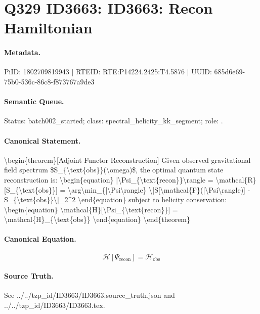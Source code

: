 \section*{Q329 ID3663: ID3663: Recon Hamiltonian}
\paragraph{Metadata.}
PiID: 1802709819943 | RTEID: RTE:P14224.2425:T4.5876 | UUID: 685d6e69-75b0-536c-86c8-f873767a9de3

\paragraph{Semantic Queue.}
Status: batch002\_started; class: spectral\_helicity\_kk\_segment; role: .

\paragraph{Canonical Statement.}
\textbackslash{}begin\{theorem\}[Adjoint Functor Reconstruction] Given observed gravitational field spectrum \$S\_\{\textbackslash{}text\{obs\}\}(\textbackslash{}omega)\$, the optimal quantum state reconstruction is: \textbackslash{}begin\{equation\} |\textbackslash{}Psi\_\{\textbackslash{}text\{recon\}\}\textbackslash{}rangle = \textbackslash{}mathcal\{R\}[S\_\{\textbackslash{}text\{obs\}\}] = \textbackslash{}arg\textbackslash{}min\_\{|\textbackslash{}Psi\textbackslash{}rangle\} \textbackslash{}|S[\textbackslash{}mathcal\{F\}(|\textbackslash{}Psi\textbackslash{}rangle)] - S\_\{\textbackslash{}text\{obs\}\}\textbackslash{}|\_2\textasciicircum{}2 \textbackslash{}end\{equation\} subject to helicity conservation: \textbackslash{}begin\{equation\} \textbackslash{}mathcal\{H\}[\textbackslash{}Psi\_\{\textbackslash{}text\{recon\}\}] = \textbackslash{}mathcal\{H\}\_\{\textbackslash{}text\{obs\}\} \textbackslash{}end\{equation\} \textbackslash{}end\{theorem\}

\paragraph{Canonical Equation.}
\[
\begin{equation} \mathcal{H}[\Psi_{\text{recon}}] = \mathcal{H}_{\text{obs}} \end{equation}
\]

\paragraph{Source Truth.}
See ../../tzp\_id/ID3663/ID3663.source\_truth.json and ../../tzp\_id/ID3663/ID3663.tex.
